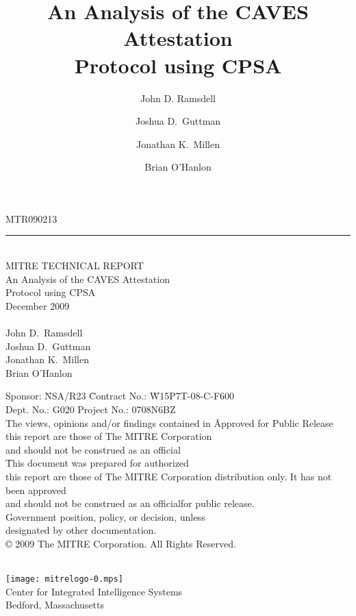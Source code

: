 \documentclass[titlepage,12pt]{article}
\title{An Analysis of the CAVES Attestation\\ Protocol using CPSA}
\author{John D. Ramsdell\and Joshua D.~Guttman\and Jonathan K.~Millen\and
Brian O'Hanlon}
\newif\ifreleased
\theoremstyle{definition}
\begin{document}
\iffalse
\maketitle
\else








\begin{titlepage}
\begin{trivlist}\sffamily\bfseries\large
\item
MTR090213\\[-1.2ex]
\hrule ~\\
{\mdseries MITRE TECHNICAL REPORT}\\[1cm]
\LARGE
An Analysis of the CAVES Attestation\\[1ex] Protocol using CPSA\\[2.5cm]
\large
December 2009\\
~\\
\mdseries
John D.~Ramsdell\\
Joshua D.~Guttman\\
Jonathan K.~Millen\\
Brian O'Hanlon \\
\vfill
\normalsize
\bfseries
\begingroup\footnotesize
\begin{tabbing}
Sponsor: \phantom{spo} \= NSA/R23 \phantom{phantom} \=
Contract No.: \phantom{pro}\= W15P7T-08-C-F600 \\
Dept. No.: \>G020 \>Project No.: \>0708N6BZ\\[1.2cm]
The views, opinions and/or findings contained in \>\>\>\phantom{space}
\ifreleased
\= Approved for Public Release\\
this report are those of The MITRE Corporation\\
and should not be construed as an official\\
\else
\= This document was prepared for authorized\\
this report are those of The MITRE Corporation \>\>\>\>distribution only. It has not been approved\\
and should not be construed as an official\>\>\>\>for public release.\\
\fi
Government position, policy, or decision, unless\\
designated by other documentation.\\[4mm]
{\copyright} 2009 The MITRE Corporation. All Rights Reserved.
\end{tabbing}
\endgroup
~\\
\noindent
\texttt{[image: mitrelogo-0.mps]}\\
Center for Integrated Intelligence Systems\\
Bedford, Massachusetts
\end{trivlist}
\end{titlepage}
\end{document}
